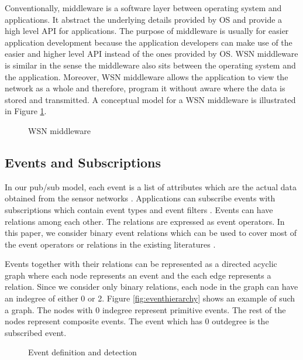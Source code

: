 Conventionally, middleware is a software layer between operating system and applications. It abstract the underlying details provided by OS and provide a high level API for applications. The purpose of middleware is usually for easier application development because the application developers can make use of the easier and higher level API instead of the ones provided by OS. WSN middleware is similar in the sense the middleware also sits between the operating system and the application. Moreover, WSN middleware allows the application to view the network as a whole and therefore, program it without aware where the data is stored and transmitted. A conceptual model for a WSN middleware is illustrated in Figure \ref{fig:middleware}.

\begin{figure}
\centering
{}
\caption{WSN middleware}
\label{fig:middleware}
\end{figure}

\subsection{Events and Subscriptions}
In our pub/sub model, each event is a list of attributes which are the actual data obtained from the sensor networks \cite{lowlevelnaming}. Applications can subscribe events with subscriptions which contain event types \cite{facespubsub} and event filters \cite{siena}. Events can have relations among each other. The relations are expressed as event operators. In this paper, we consider binary event relations which can be used to cover most of the event operators or relations in the existing literatures \cite{cea, samos}.

Events together with their relations can be represented as a directed acyclic graph where each node represents an event and the each edge represents a relation. Since we consider only binary relations, each node in the graph can have an indegree of either 0 or 2. Figure \ref{fig:eventhierarchy} shows an example of such a graph. The nodes with 0 indegree represent primitive events. The rest of the nodes represent composite events. The event which has 0 outdegree is the subscribed event.

\begin{figure}
\centering
{}
\caption{Event definition and detection}
\label{fig:defndetection}
\end{figure}

